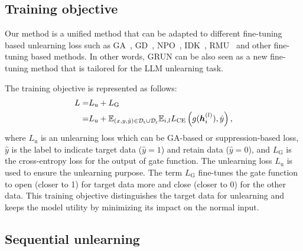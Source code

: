 



\subsection{Training objective}


Our method is a unified method that can be adapted to different fine-tuning based unlearning loss such as GA~\cite{yao2023large}, GD~\cite{liu2022continual}, NPO~\cite{zhang2024negative}, IDK~\cite{maini2024tofu}, RMU~\cite{liwmdp} and other fine-tuning based methods. In other words, GRUN can be also seen as a new fine-tuning method that is tailored for the LLM unlearning task.

The training objective is represented as follows:
\begin{align}
    L = & L_{\text{u}} + L_{\text{G}} \\
      = & L_{\text{u}} + \mathbb{E}_{(x, y, \hat{y}) \in \mathcal{D}_{\mathrm{t}} \cup \mathcal{D}_{\mathrm{r}}} \mathbb{E}_{i,l} L_{\text{CE}} \left(g(\boldsymbol{h}_i^{(l)}), \hat{y}\right), \notag
\end{align}
where $L_{\text{u}}$ is an unlearning loss which can be GA-based or suppression-based loss, $\hat{y}$ is the label to indicate target data ($\hat{y} = 1$) and retain data ($\hat{y} = 0$), and $L_{\text{G}}$ is the cross-entropy loss for the output of gate function. The unlearning loss $L_{\text{u}}$ is used to ensure the unlearning purpose. The term $L_{\text{G}}$ fine-tunes the gate function to open (closer to 1) for target data more and close (closer to 0) for the other data. {This training objective 
distinguishes the target data for unlearning and keeps the model utility by minimizing its impact on the normal input.}

\subsection{Sequential unlearning}

